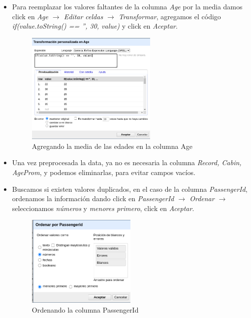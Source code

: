 \documentclass[12pt]{article}
\begin{document}
\begin{itemize}
                    \item Para reemplazar los valores faltantes de la columna \textit{Age} por la media damos click en \textit{Age $\rightarrow$  Editar celdas $\rightarrow$  Transformar}, agregamos el código \textit{if(value.toString() == '', 30, value)} y click en \textit{Aceptar}.
                        \begin{figure}[!h]
                            \centering
                            \includegraphics[width=0.6\textwidth]{img/openrefine-19.png}
                            \caption{Agregando la media de las edades en la columna Age}
                        \end{figure}
                    
                    \item Una vez preprocesada la data, ya no es necesaria la columna \textit{Record, Cabin, AgeProm}, y podemos eliminarlas, para evitar campos vacíos.
                    \item Buscamos si existen valores duplicados, en el caso de la columna \textit{PassengerId}, ordenamos la información dando click en \textit{PassengerId $\rightarrow$ Ordenar $\rightarrow$} seleccionamos \textit{números} y \textit{menores primero}, click en \textit{Aceptar}.
                        \begin{figure}[!h]
                            \centering
                            \includegraphics[width=0.5\textwidth]{img/openrefine-20.png}
                            \caption{Ordenando la columna PassengerId}
                        \end{figure}
                    

\end{itemize}
\end{document}
